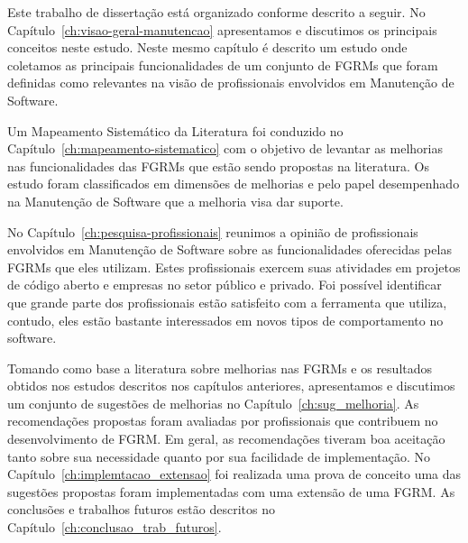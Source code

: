 Este trabalho de dissertação está organizado conforme descrito a seguir. No
Capítulo~\ref{ch:visao-geral-manutencao} apresentamos e discutimos os principais
conceitos neste estudo. Neste mesmo capítulo é descrito um estudo onde coletamos
as principais funcionalidades de um conjunto de FGRMs que foram definidas como
relevantes na visão de profissionais envolvidos em Manutenção de Software.

Um Mapeamento Sistemático da Literatura foi conduzido no
Capítulo~\ref{ch:mapeamento-sistematico} com o objetivo de levantar as melhorias
nas funcionalidades das FGRMs que estão sendo propostas na literatura. Os estudo
foram classificados em dimensões de melhorias e pelo papel desempenhado na
Manutenção de Software que a melhoria visa dar suporte.

No Capítulo~\ref{ch:pesquisa-profissionais} reunimos a opinião de profissionais
envolvidos em Manutenção de Software sobre as funcionalidades oferecidas pelas
FGRMs que eles utilizam. Estes profissionais exercem suas atividades em projetos
de código aberto e empresas no setor público e privado. Foi possível identificar
que grande parte dos profissionais estão satisfeito com a ferramenta que
utiliza, contudo, eles estão bastante interessados em novos tipos de
comportamento no software.

Tomando como base a literatura sobre melhorias nas FGRMs e os resultados obtidos
nos estudos descritos nos capítulos anteriores, apresentamos e discutimos um
conjunto de sugestões de melhorias no Capítulo~\ref{ch:sug_melhoria}. As
recomendações propostas foram avaliadas por profissionais que contribuem no
desenvolvimento de FGRM\@. Em geral, as recomendações tiveram boa aceitação
tanto sobre sua necessidade quanto por sua facilidade de implementação.  No
Capítulo~\ref{ch:implemtacao_extensao} foi realizada uma prova de conceito uma
das sugestões propostas foram implementadas com uma extensão de uma FGRM\@. As
conclusões e trabalhos futuros estão descritos no
Capítulo~\ref{ch:conclusao_trab_futuros}.
